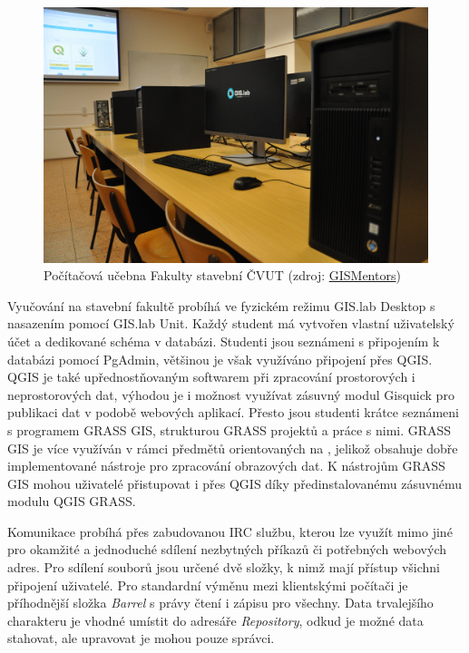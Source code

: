 \begin{figure}[H] \centering
    \includegraphics[width=350pt]{./pictures/classroom.jpg}
    \caption[Počítačová učebna Fakulty stavební ČVUT]{Počítačová učebna Fakulty stavební ČVUT (zdroj:
	\href{http://gismentors.cz/wp-content/uploads/2018/12/DSC_0051.jpg}{GISMentors})}
    \label{fig:gisquick-welcome}
\end{figure}

Vyučování na stavební fakultě probíhá ve fyzickém režimu GIS.lab Desktop s nasazením
pomocí GIS.lab Unit. Každý student má vytvořen vlastní uživatelský
účet a dedikované schéma v databázi. Studenti jsou seznámeni s
připojením k databázi pomocí PgAdmin, většinou je však využíváno
připojení přes QGIS. QGIS je také upřednostňovaným softwarem při
zpracování prostorových i neprostorových dat, výhodou je i možnost
využívat zásuvný modul Gisquick pro publikaci dat v podobě webových
aplikací. Přesto jsou studenti krátce seznámeni s programem GRASS GIS,
strukturou GRASS projektů a práce s nimi. GRASS GIS je více využíván v
rámci předmětů orientovaných na , jelikož obsahuje dobře
implementované nástroje pro zpracování obrazových dat. K nástrojům
GRASS GIS mohou uživatelé přistupovat i přes QGIS  díky
předinstalovanému zásuvnému modulu QGIS GRASS.

Komunikace probíhá přes zabudovanou IRC službu, kterou lze využít mimo
jiné pro okamžité a jednoduché sdílení nezbytných příkazů či
potřebných webových adres. Pro sdílení souborů jsou určené dvě složky,
k nimž mají přístup všichni připojení uživatelé. Pro standardní výměnu
mezi klientskými počítači je příhodnější složka \textit{Barrel} s
právy čtení i zápisu pro všechny. Data trvalejšího charakteru je
vhodné umístit do adresáře \textit{Repository}, odkud je možné data
stahovat, ale upravovat je mohou pouze správci.

